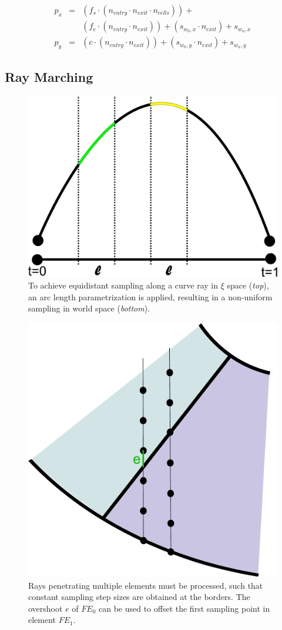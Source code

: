 \documentclass[review,journal]{vgtc}         %
\begin{document}
\begin{eqnarray*}
p_x & = &(f_s \cdot (n_{entry} \cdot n_{exit} \cdot n_{cells})) + \\
	&  &(f_e \cdot (n_{entry} \cdot n_{exit})) + (s_{w_0,x} \cdot n_{exit}) + s_{w_n,x}\\
p_y & = &(c   \cdot (n_{entry} \cdot n_{exit})) + (s_{w_0,y} \cdot n_{exit}) + s_{w_n,y}
\end{eqnarray*}

\subsection{Ray Marching}

\begin{figure}[b]
\centering
\includegraphics[width=0.5\linewidth]{figures/arclength}
\caption{To achieve equidistant sampling along a curve ray in $\xi$ space ({\it top}), an arc length parametrization is applied, resulting in a non-uniform sampling in world space ({\it bottom}).}
\label{fig:arclength}
\end{figure}

\begin{figure}[t]
    \centering
    \includegraphics[width=0.3\linewidth]{figures/overshoot}
    \caption{Rays penetrating multiple elements must be processed, such that constant sampling step sizes are obtained at the borders. The overshoot $e$ of $FE_0$ can be used to offset the first sampling point in element $FE_1$.}
    \label{fig:overshoot}
\end{figure}
\end{document}
